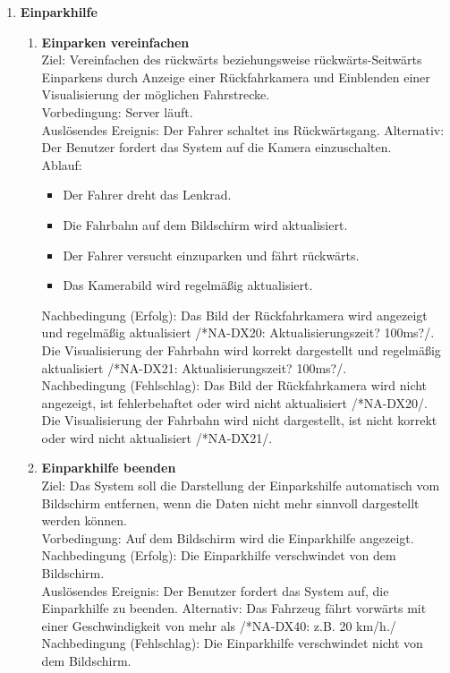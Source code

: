 \documentclass[pflichtenheft.tex]{subfiles}
\begin{document}
\begin{enumerate}
	\item{\textbf{Einparkhilfe}}
	
	\begin{enumerate}
	
	\item{\textbf{Einparken vereinfachen}} \\ Ziel: Vereinfachen des rückwärts beziehungsweise rückwärts-Seitwärts Einparkens durch Anzeige einer Rückfahrkamera und Einblenden einer Visualisierung der möglichen Fahrstrecke. \\ Vorbedingung: Server läuft. \\ Auslösendes Ereignis:  Der Fahrer schaltet ins Rückwärtsgang. Alternativ: Der Benutzer fordert das System auf die Kamera einzuschalten. \\ Ablauf:
	\begin{itemize}
			\item Der Fahrer dreht das Lenkrad.
			\item Die Fahrbahn auf dem Bildschirm wird aktualisiert.
			\item Der Fahrer versucht einzuparken und fährt rückwärts.
			\item Das Kamerabild wird regelmäßig aktualisiert.
	\end{itemize}
Nachbedingung (Erfolg): Das Bild der Rückfahrkamera wird angezeigt und regelmäßig aktualisiert /*NA-DX20: Aktualisierungszeit? 100ms?/. Die Visualisierung der Fahrbahn wird korrekt dargestellt und regelmäßig aktualisiert /*NA-DX21: Aktualisierungszeit? 100ms?/. \\ Nachbedingung (Fehlschlag): Das Bild der Rückfahrkamera wird nicht angezeigt, ist fehlerbehaftet oder wird nicht aktualisiert /*NA-DX20/. Die Visualisierung der Fahrbahn wird nicht dargestellt, ist nicht korrekt oder wird nicht aktualisiert /*NA-DX21/. 

	\item{\textbf{Einparkhilfe beenden}} \\ Ziel: Das System soll die Darstellung der Einparkshilfe automatisch vom Bildschirm entfernen, wenn die Daten nicht mehr sinnvoll dargestellt werden können. \\ Vorbedingung: Auf dem Bildschirm wird die Einparkhilfe angezeigt. \\ Nachbedingung (Erfolg): Die Einparkhilfe verschwindet von dem Bildschirm. \\ Auslösendes Ereignis: Der Benutzer fordert das System auf, die Einparkhilfe zu beenden. Alternativ: Das Fahrzeug fährt vorwärts mit einer Geschwindigkeit von mehr als /*NA-DX40: z.B. 20 km/h./ \\  Nachbedingung (Fehlschlag): Die Einparkhilfe verschwindet nicht von dem Bildschirm.
	

\end{enumerate}
\end{enumerate}
\end{document}
